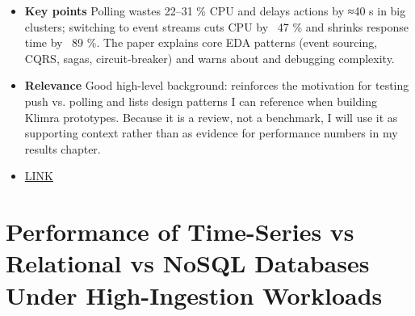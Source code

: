 \documentclass[11pt]{article}
\begin{document}
\begin{itemize}
\begin{itemize}
      \item[] \textbf{Key points}  Polling wastes 22–31 \% CPU and delays actions by ≈40 s in big clusters; switching to event streams cuts CPU by ~47 \% and shrinks response time by ~89 \%.  The paper explains core EDA patterns (event sourcing, CQRS, sagas, circuit-breaker) and warns about  and debugging complexity.
      
      \item[] \textbf{Relevance}  Good high-level background: reinforces the motivation for testing push vs. polling and lists design patterns I can reference when building Klimra prototypes.  Because it is a review, not a benchmark, I will use it as supporting context rather than as evidence for performance numbers in my results chapter.
      \item[] \href{https://www.ijsat.org/research-paper.php?id=3113}{LINK}
  \end{itemize}
\end{itemize}

\newpage
\section*{Performance of Time-Series vs Relational vs NoSQL Databases Under High-Ingestion Workloads}
\end{document}
